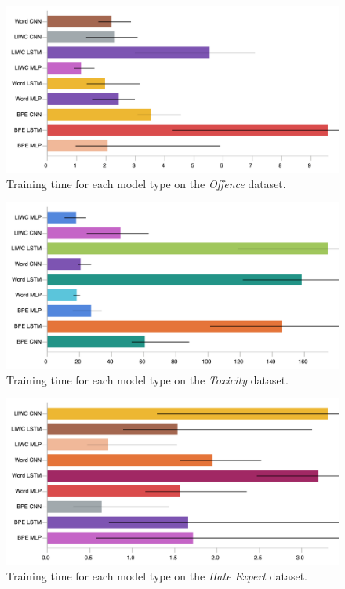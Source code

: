 \begin{figure}[h]
    \centering
    \includegraphics[width=\textwidth]{davidson_train_time.pdf}
    \caption{Training time for each model type on the \textit{Offence} dataset.}
    \label{fig:davidson_train_time}
\end{figure}
\begin{figure}[h]
    \centering
    \includegraphics[width=\textwidth]{wulczyn_train_time.pdf}
    \caption{Training time for each model type on the \textit{Toxicity} dataset.}
    \label{fig:wulczyn_train_time}
\end{figure}
\begin{figure}[h]
    \centering
    \includegraphics[width=\textwidth]{waseem_train_time.pdf}
    \caption{Training time for each model type on the \textit{Hate Expert} dataset.}
    \label{fig:waseem_train_time}
\end{figure}
